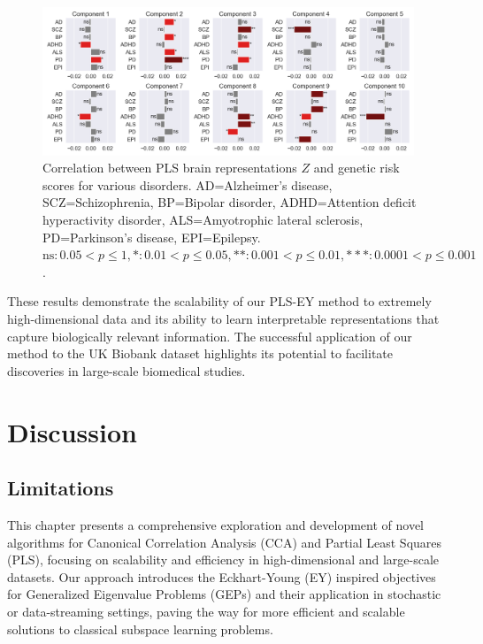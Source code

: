 \begin{figure}
\centering
\includegraphics[width=0.99\textwidth,trim={0.5cm 0cm 0.7cm 0cm}]{figures/UKBB/prs_correlations.png}
\caption{Correlation between PLS brain representations $Z$ and genetic risk scores for various disorders. AD=Alzheimer's disease, SCZ=Schizophrenia, BP=Bipolar disorder, ADHD=Attention deficit hyperactivity disorder, ALS=Amyotrophic lateral sclerosis, PD=Parkinson's disease, EPI=Epilepsy. $\text{ns}: 0.05 < p \leq 1, \ast: 0.01 < p \leq 0.05, \ast\ast: 0.001 < p \leq 0.01, \ast\ast\ast: 0.0001 < p \leq 0.001$.}
\label{fig:genetic_risk}
\end{figure}
These results demonstrate the scalability of our PLS-EY method to extremely high-dimensional data and its ability to learn interpretable representations that capture biologically relevant information. The successful application of our method to the UK Biobank dataset highlights its potential to facilitate discoveries in large-scale biomedical studies.

\section{Discussion}\label{sec:discussion}

\subsection{Limitations}

This chapter presents a comprehensive exploration and development of novel algorithms for Canonical Correlation Analysis (CCA) and Partial Least Squares (PLS), focusing on scalability and efficiency in high-dimensional and large-scale datasets.
Our approach introduces the Eckhart-Young (EY) inspired objectives for Generalized Eigenvalue Problems (GEPs) and their application in stochastic or data-streaming settings, paving the way for more efficient and scalable solutions to classical subspace learning problems.

